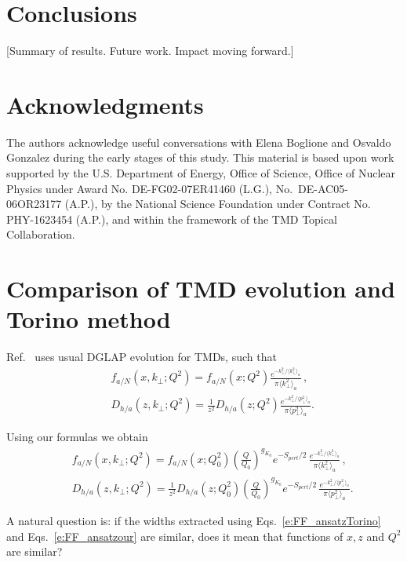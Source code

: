 \documentclass[final,3p,times,onecolumn,sort&compress,hidelinks]{elsarticle}
\newcommand\3[1]{\boldsymbol{#1}}
\begin{document}
\section{Conclusions}
\label{s:concl}
[Summary of results.  Future work.  Impact moving forward.]



 
\section*{Acknowledgments}
The authors acknowledge useful conversations with Elena Boglione and Osvaldo Gonzalez during the early stages of this study.
 This material is based upon work supported by the
U.S. Department of Energy, Office of Science, Office of Nuclear
Physics under Award No. DE-FG02-07ER41460 (L.G.), No.~DE-AC05-06OR23177 (A.P.), by the National Science Foundation 
under Contract No. PHY-1623454 (A.P.), and within the 
framework of the TMD Topical Collaboration.


\appendix
\section{Comparison of TMD evolution and Torino method}
\label{appendix}

Ref.~\cite{Anselmino:2013lza} uses usual DGLAP evolution for TMDs, such that
\begin{eqnarray}
&&f_{a/N} (x,k_\perp; Q^2)= f_{a/N} (x; Q^2) \frac{e^{-k_\perp^2/{\langle k_\perp^2 \rangle_a}}}{\pi \langle k_\perp^2 \rangle_a}\,,
\nonumber \\[0.3cm]
&&D_{h/a}(z,k_\perp; Q^2) =  \frac{1}{z^2} D_{h/a}(z; Q^2) \frac{e^{-k_\perp^2/{\langle p_\perp^2 \rangle_a}}}{\pi \langle p_\perp^2 \rangle_a}.
\label{e:FF_ansatzTorino}
\end{eqnarray}

Using our formulas we obtain
\begin{eqnarray}
&&f_{a/N} (x,k_\perp; Q^2)= f_{a/N} (x; Q_0^2) \left( \frac{Q}{Q_0}\right)^{g_{K_0}}e^{-S_{pert}/2}\,\frac{e^{-k_\perp^2/{\langle k_\perp^2 \rangle_a}}} {\pi \langle k_\perp^2 \rangle_a}\, ,
\nonumber \\[0.3cm]
&&D_{h/a}(z,k_\perp; Q^2) =  \frac{1}{z^2} D_{h/a}(z; Q_0^2)  \left( \frac{Q}{Q_0}\right)^{g_{K_0}}e^{-S_{pert}/2}\,  \frac{e^{-k_\perp^2/{\langle p_\perp^2 \rangle_a}}}{\pi \langle p_\perp^2 \rangle_a}.
\label{e:FF_ansatzour}
\end{eqnarray}

A natural question is: if the widths extracted using Eqs.~\eqref{e:FF_ansatzTorino} and Eqs.~\eqref{e:FF_ansatzour} are similar, does it mean that functions of $x,z$ and $Q^2$ are similar?
\end{document}
